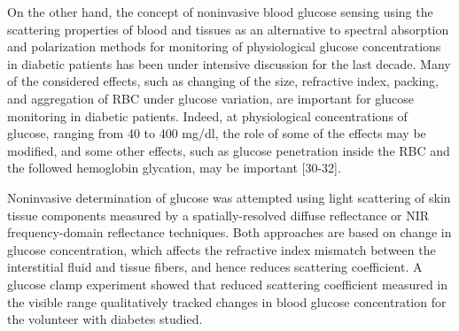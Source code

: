On the other hand, the concept of noninvasive blood glucose
sensing using the scattering properties of blood and tissues as an
alternative to spectral absorption and polarization methods for
monitoring of physiological glucose concentrations in diabetic
patients has been under intensive discussion for the last decade.
Many of the considered  effects, such as changing of the size,
refractive index, packing, and aggregation of RBC under glucose
variation, are important for glucose monitoring in diabetic
patients. Indeed, at physiological concentrations of glucose,
ranging from 40 to 400 mg/dl, the role of some of the effects may
be modified, and some other effects, such as glucose penetration
inside the RBC and the followed hemoglobin glycation, may be
important [30-32].

Noninvasive determination of glucose was attempted using light
scattering of skin tissue components measured by a
spatially-resolved diffuse reflectance or NIR fre\-quen\-cy-domain
reflectance techniques. Both approaches are based on change in
glucose concentration, which affects the refractive index mismatch
between the interstitial fluid and tissue fibers, and hence
reduces scattering coefficient. A glucose clamp experiment showed
that reduced scattering coefficient measured in the visible range
qualitatively tracked changes in blood glucose concentration for
the volunteer with diabetes studied.
